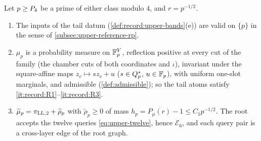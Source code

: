 \begin{lemma}\label{lem:tail-law}
Let $p\ge P_4$ be a prime of either class modulo $4$, and $r=p^{-1/2}$.
\begin{enumerate}[label=(\roman*)]
\item The inputs of the tail datum (\cref{def:record:upper-bands}(e)) are
 valid on $\{p\}$ in the sense of \cref{subsec:upper-reference-rp}.
\item $\mu_p$ is a probability measure on $\mathbb F_p^V$, reflection positive at
 every cut of the family (the chamber cuts of both coordinates and
 $\iota$), invariant under the square-affine maps $z_v\mapsto sz_v+u$
 ($s\in Q_{p}^{*}$, $u\in\mathbb F_p$), with uniform one-slot marginals, and admissible
 (\cref{def:admissible}); so the tail atoms satisfy
 \ref{it:record:R1}--\ref{it:record:R3}.
\item $\widetilde\mu_p=\pi_{\rm LL,2}+\widetilde\rho_p$ with $\widetilde\rho_p\ge0$
 of mass $h_p=P_\mu(r)-1\le C_1p^{-1/2}$. The root accepts the twelve
 queries \eqref{eq:upper-twelve}, hence $\mathcal E_6$, and each query pair
 is a cross-layer edge of the root graph.
\end{enumerate}
\end{lemma}

